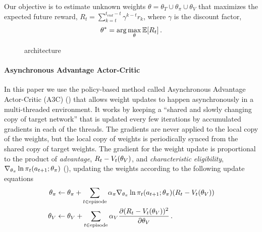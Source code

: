 Our objective is to estimate unknown weights $\theta = \theta_T \cup \theta_\pi \cup \theta_V$ that maximizes the expected future reward, $R_t = \sum_{k=t}^{t_{end} - t} \gamma^{k-t} r_k$, where $\gamma$ is the discount factor,
%
\begin{align}
\theta^* = \arg\max_{\theta} \mathbb{E}[R_t] \,.
\end{align}
%
\begin{figure}%
\begin{center}
%
\end{center}
\caption{\NavAiiiCDiDiiL{} architecture}
\label{fig:architectures}
\end{figure}

\paragraph{Asynchronous Advantage Actor-Critic}
\def\charelig{\nabla_{\theta_\pi}\ln \pit(\acttn; \theta_\pi)}
In this paper we use the policy-based method called Asynchronous Advantage Actor-Critic (A3C) (\cite{MnBaMiICML2016}) that allows weight updates to happen asynchronously in a multi-threaded environment.
It works by keeping a ``shared and slowly changing copy of target network'' that is updated every few iterations by accumulated gradients in each of the threads.
The gradients are never applied to the local copy of the weights, but the local copy of weights is periodically synced from the shared copy of target weights.
The gradient for the weight update is proportional to the product of \emph{advantage}, $R_t - V_t(\theta_V)$, and \emph{characteristic eligibility}, $\charelig$ (\cite{WiML1992}), updating the weights according to the following update equations
\begin{align}
  \theta_\pi &\leftarrow \theta_\pi
  + \sum_{t \in \text{episode}}\alpha_\pi \charelig (R_t - \Value_t(\theta_\Value))
  \\
  \theta_\Value &\leftarrow \theta_\Value
  + \sum_{t \in \text{episode}} \alpha_\Value \frac{\partial (R_t - \Value_t(\theta_\Value))^2}
                  {\partial\theta_\Value}
                  \, .
\end{align}

